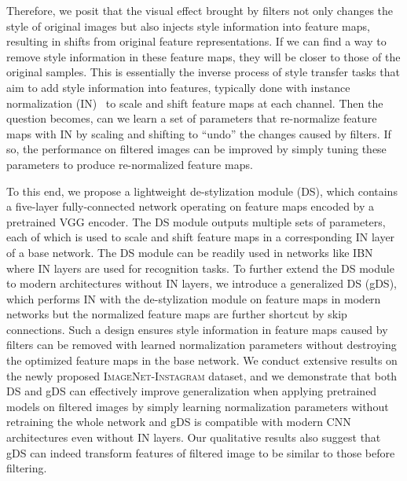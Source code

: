 \documentclass[letterpaper]{article} %
\newcommand{\cmt}[1]{{\footnotesize\textcolor{red}{#1}}}
\newcommand{\todo}[1]{\cmt{(TODO: #1)}}
\newcommand{\instagram}{{\scshape ImageNet-Instagram}\xspace}
\newcommand{\system}{DS\xspace}
\newcommand{\gsystem}{gDS\xspace}
\begin{document}
Therefore, we posit that the visual effect brought by filters not only changes the style of original images but also injects style information into feature maps, resulting in shifts from original feature representations. If we can find a way to remove style information in these feature maps, they will be closer to those of the original samples. This is essentially the inverse process of style transfer tasks that aim to add style information into features, typically done with instance normalization (IN)~\cite{ulyanov2016instance} to scale and shift feature maps at each channel. Then the question becomes, can we learn a set of parameters that re-normalize feature maps with IN by scaling and shifting to ``undo'' the changes caused by filters. If so, the performance on filtered images can be improved by simply tuning these parameters to produce re-normalized feature maps. 


To this end, we propose a lightweight de-stylization module (DS), which contains a five-layer fully-connected network operating on feature maps encoded by a pretrained VGG encoder. The DS module outputs multiple sets of parameters, each of which is used to scale and shift feature maps in a corresponding IN layer of a base network. The DS module can be readily used in networks like IBN~\cite{pan2018two} where IN layers are used for recognition tasks. To further extend the DS module to modern architectures without IN layers, we introduce a generalized DS (\gsystem), which performs IN with the de-stylization module on feature maps in modern networks but the normalized feature maps are further shortcut by skip connections. Such a design ensures style information in feature maps caused by filters can be removed with learned normalization parameters without destroying the optimized feature maps in the base network. We conduct extensive results on the newly proposed \instagram dataset, and we demonstrate that both \system and \gsystem can effectively improve generalization when applying pretrained models on filtered images by simply learning normalization parameters without retraining the whole network and \gsystem is compatible with modern CNN architectures even without IN layers. Our qualitative results also suggest that \gsystem can indeed transform features of filtered image to be similar to those before filtering.
\end{document}
